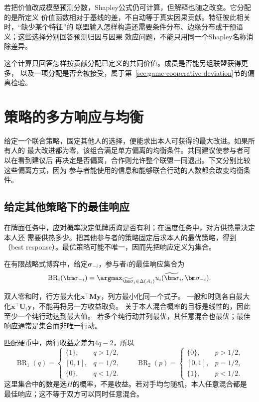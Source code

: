 若把价值改成模型预测分数，Shapley公式仍可计算，但解释也随之改变。它分配的是所定义
价值函数相对于基线的差，不自动等于真实因果贡献。特征彼此相关时，“缺少某个特征”的
联盟输入怎样构造还需要条件分布、边缘分布或干预语义；这些选择分别回答预测归因与因果
效应问题，不能只用同一个Shapley名称消除差异。

这个计算只回答怎样按贡献分配已定义的共同价值。成员是否能另组联盟获得更多，
以及一项分配是否会被接受，属于第~\ref{sec:game-cooperative-deviation}节的偏离检验。

\section{策略的多方响应与均衡}
\label{sec:game-best-response-equilibrium}

给定一个联合策略，固定其他人的选择，便能求出本人可获得的最大改进。如果所有人的
最大改进都为零，该组合满足单方偏离的均衡条件。共同建议使参与者可以在看到建议后
再决定是否偏离，合作则允许整个联盟一同退出。下文分别比较这些偏离方式，因为
参与者能使用的信息和能够联合行动的人数都会改变均衡条件。

\subsection{给定其他策略下的最佳响应}
\label{sec:game-best-response}

在牌面任务中，应对概率决定低牌质询是否有利；在温度任务中，对方供热量决定本人还
需要供热多少。把其他参与者的策略固定后求本人的最优策略，得到
（best response）。最优策略可能不唯一，因而先把响应定义为集合。
\begin{definition}[最佳响应]
\label{def:game-best-response}
在有限战略式博弈中，给定\(\bm\sigma_{-i}\)，参与者\(i\)的最佳响应集合为
\[
  \operatorname{BR}_i(\bm\sigma_{-i})
  =\argmax_{\widetilde{\bm\sigma}_i\in\Delta(A_i)}
       u_i(\widetilde{\bm\sigma}_i,\bm\sigma_{-i}).
\]
\end{definition}
双人零和时，行方最大化\(\bm x^\top\bm M\bm y\)，列方最小化同一个式子。
一般和时则各自最大化\(\bm x^\top\bm U_i\bm y\)，不能再将另一方收益取负。
关于本人混合概率的目标是线性的，因此至少一个纯行动达到最大值。
若多个纯行动并列最优，其任意混合也最优；最佳响应通常是集合而非唯一行动。

匹配硬币中，两行收益之差为\(4q-2\)，所以
\[
 \operatorname{BR}_1(q)=
 \begin{cases}\{1\},&q>1/2,\\[1pt]
 [0,1],&q=1/2,\\[1pt]\{0\},&q<1/2.\end{cases}
 \qquad
 \operatorname{BR}_2(p)=
 \begin{cases}\{0\},&p>1/2,\\[1pt]
 [0,1],&p=1/2,\\[1pt]\{1\},&p<1/2.\end{cases}
\]
这里集合中的数是选\(H\)的概率，不是收益。若对手均匀随机，本人任意混合都是
最佳响应；这不等于双方可以同时任意混合。

